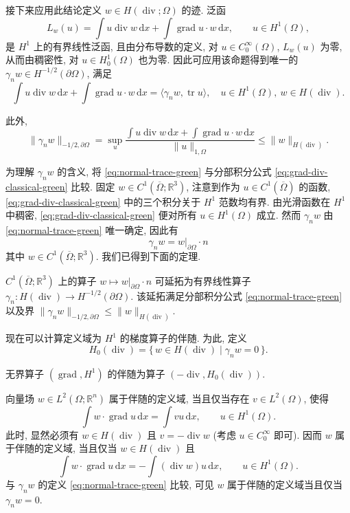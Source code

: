 接下来应用此结论定义 $w\in H(\operatorname{div};\Omega)$ 的迹. 泛函
\[
L_w(u)=\int u\operatorname{div}w\,\mathrm{d}x+\int\operatorname{grad}u\cdot w\,\mathrm{d}x,\qquad u\in H^1(\Omega),
\]
是 $H^1$ 上的有界线性泛函, 且由分布导数的定义, 对 $u\in C_0^\infty(\Omega)$, $L_w(u)$ 为零, 从而由稠密性, 对 $u\in H_0^1(\Omega)$ 也为零. 因此可应用该命题得到唯一的 $\gamma_n w\in H^{-1/2}(\partial\Omega)$, 满足
\begin{equation}\label{eq:normal-trace-green}
\int u\operatorname{div}w\,\mathrm{d}x+\int\operatorname{grad}u\cdot w\,\mathrm{d}x=\langle\gamma_n w,\operatorname{tr}u\rangle,\quad u\in H^1(\Omega),\ w\in H(\operatorname{div}).
\end{equation}

此外,
\[
\|\gamma_n w\|_{-1/2,\partial\Omega}=\sup_u\frac{\int u\operatorname{div}w\,\mathrm{d}x+\int\operatorname{grad}u\cdot w\,\mathrm{d}x}{\|u\|_{1,\Omega}}\leq\|w\|_{H(\operatorname{div})}.
\]

为理解 $\gamma_n w$ 的含义, 将 \eqref{eq:normal-trace-green} 与分部积分公式 \eqref{eq:grad-div-classical-green} 比较. 固定 $w\in C^1(\overline\Omega;\mathbb R^3)$, 注意到作为 $u\in C^1(\overline\Omega)$ 的函数, \eqref{eq:grad-div-classical-green} 中的三个积分关于 $H^1$ 范数均有界. 由光滑函数在 $H^1$ 中稠密, \eqref{eq:grad-div-classical-green} 便对所有 $u\in H^1(\Omega)$ 成立. 然而 $\gamma_n w$ 由 \eqref{eq:normal-trace-green} 唯一确定, 因此有
\[
\gamma_n w=w|_{\partial\Omega}\cdot n
\]
其中 $w\in C^1(\overline\Omega;\mathbb R^3)$. 我们已得到下面的定理.

\begin{Theorem}\label{thm:normal-trace-extension}
$C^1(\overline\Omega;\mathbb R^3)$ 上的算子 $w\mapsto w|_{\partial\Omega}\cdot n$ 可延拓为有界线性算子 $\gamma_n:H(\operatorname{div})\to H^{-1/2}(\partial\Omega)$. 该延拓满足分部积分公式 \eqref{eq:normal-trace-green} 以及界 $\|\gamma_n w\|_{-1/2,\partial\Omega}\leq\|w\|_{H(\operatorname{div})}$.
\end{Theorem}

现在可以计算定义域为 $H^1$ 的梯度算子的伴随. 为此, 定义
\[
 H_0(\operatorname{div})=\{\,w\in H(\operatorname{div})\mid\gamma_n w=0\,\}.
\]

\begin{Theorem}\label{thm:gradient-adjoint-zero-normal}
无界算子 $(\operatorname{grad},H^1)$ 的伴随为算子 $(-\operatorname{div}, H_0(\operatorname{div}))$.
\end{Theorem}

\begin{Proof}
向量场 $w\in L^2(\Omega;\mathbb R^n)$ 属于伴随的定义域, 当且仅当存在 $v\in L^2(\Omega)$, 使得
\[
\int w\cdot\operatorname{grad}u\,\mathrm{d}x=\int vu\,\mathrm{d}x,\qquad u\in H^1(\Omega).
\]
此时, 显然必须有 $w\in H(\operatorname{div})$ 且 $v=-\operatorname{div}w$ (考虑 $u\in C_0^\infty$ 即可). 因而 $w$ 属于伴随的定义域, 当且仅当 $w\in H(\operatorname{div})$ 且
\[
\int w\cdot\operatorname{grad}u\,\mathrm{d}x=-\int(\operatorname{div}w)u\,\mathrm{d}x,\qquad u\in H^1(\Omega).
\]
与 $\gamma_n w$ 的定义 \eqref{eq:normal-trace-green} 比较, 可见 $w$ 属于伴随的定义域当且仅当 $\gamma_n w=0$.
\end{Proof}

